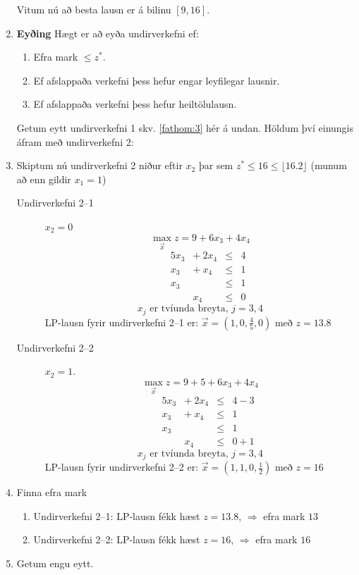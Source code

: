 \begin{lausnSYND}
\begin{enumerate}
\begin{aths}Vitum nú að besta lausn er á bilinu $[9,16]$.\end{aths}


\item {\bf Eyðing} Hægt er að eyða undirverkefni ef:
  \begin{enumerate}[label=(\roman{*})]
  \item Efra mark $\le z^*$.
  \item Ef afslappaða verkefni þess hefur engar  leyfilegar lausnir.
  \item\label{fathom:3} Ef afslappaða verkefni þess hefur heiltölulausn.
  \end{enumerate}
Getum eytt undirverkefni 1 skv. \ref{fathom:3} hér á undan. Höldum því einungis áfram með undirverkefni 2:
\item Skiptum nú undirverkefni 2 niður eftir $x_2$ þar sem $z^*\leq 16\leq \lfloor16.2\rfloor$ (munum að enn gildir $x_1=1$)
\begin{description}
\item[Undirverkefni 2--1] $x_2 = 0$ 
$$ \max_{\vec{x}} z = 9+ 6 x_3 + 4 x_4$$
\[\begin{array}{rrrrcl}
      && 5 x_3 &+~ 2 x_4 & \le & 4 \\
      &&    x_3 &+~   x_4 & \le & 1 \\
      &&   x_3 &        & \le & 1 \\
      &&        &   x_4 & \le & 0
\end{array}\]
$$ x_j \mbox{ er tvíunda breyta, $j=3,4$}$$
LP-lausn fyrir undirverkefni 2--1 er: $\vec{x}=(1,0,\frac{4}{5},0)$ með $z=13.8$
\item[Undirverkefni 2--2] $x_2 = 1$.
$$ \max_{\vec{x}} z = 9+ 5+ 6 x_3 + 4 x_4$$
\[\begin{array}{rrrrcl}
      & & 5 x_3 &+~2 x_4 & \le & 4-3 \\
      & &    x_3 &+~ x_4 & \le & 1 \\
      & &   x_3 &        & \le & 1 \\
      & &        &   x_4 & \le & 0+1
\end{array}\]
$$ x_j \mbox{ er tvíunda breyta, $j=3,4$}$$
LP-lausn fyrir undirverkefni 2--2 er: $\vec{x}=(1,1,0,\frac{1}{2})$ með $z=16$
\end{description}
\item Finna efra mark
\begin{enumerate}
  \item Undirverkefni 2--1: LP-lausn fékk hæst $z=13.8$, $\Rightarrow$ efra mark $13$
  \item Undirverkefni 2--2: LP-lausn fékk hæst $z=16$, $\Rightarrow$ efra mark $16$
\end{enumerate}
\item Getum engu eytt.


\end{enumerate}
\end{lausnSYND}

